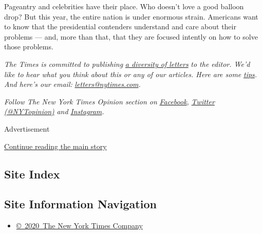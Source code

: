 Pageantry and celebrities have their place. Who doesn't love a good
balloon drop? But this year, the entire nation is under enormous strain.
Americans want to know that the presidential contenders understand and
care about their problems --- and, more than that, that they are focused
intently on how to solve those problems.

\emph{The Times is committed to publishing}
\href{https://www.nytimes.com/2019/01/31/opinion/letters/letters-to-editor-new-york-times-women.html}{\emph{a
diversity of letters}} \emph{to the editor. We'd like to hear what you
think about this or any of our articles. Here are some}
\href{https://help.nytimes.com/hc/en-us/articles/115014925288-How-to-submit-a-letter-to-the-editor}{\emph{tips}}\emph{.
And here's our email:}
\href{mailto:letters@nytimes.com}{\emph{letters@nytimes.com}}\emph{.}

\emph{Follow The New York Times Opinion section on}
\href{https://www.facebook.com/nytopinion}{\emph{Facebook}}\emph{,}
\href{http://twitter.com/NYTOpinion}{\emph{Twitter (@NYTopinion)}}
\emph{and}
\href{https://www.instagram.com/nytopinion/}{\emph{Instagram}}\emph{.}

Advertisement

\protect\hyperlink{after-bottom}{Continue reading the main story}

\hypertarget{site-index}{%
\subsection{Site Index}\label{site-index}}

\hypertarget{site-information-navigation}{%
\subsection{Site Information
Navigation}\label{site-information-navigation}}

\begin{itemize}
\tightlist
\item
  \href{https://help.nytimes.com/hc/en-us/articles/115014792127-Copyright-notice}{©~2020~The
  New York Times Company}
\end{itemize}

